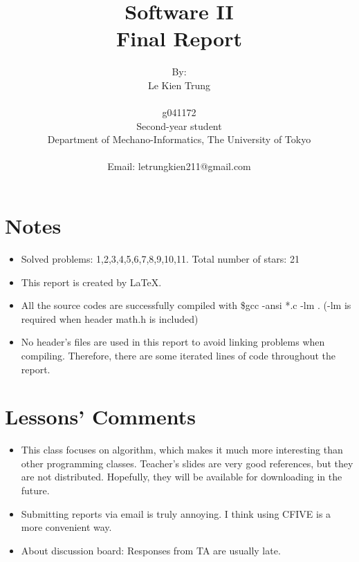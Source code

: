 \documentclass[11pt]{article}
\begin{document}
\begin{titlepage}
\title{\bf \Huge Software II\\
\huge Final Report}
\author{By:\\ Le Kien Trung\\\\
g041172\\
Second-year student\\
Department of Mechano-Informatics, The University of Tokyo \\\\
Email: letrungkien211@gmail.com
}
\maketitle
\thispagestyle{empty}
\end{titlepage}
\setcounter{page}{1}
\tableofcontents
\newpage
\section*{Notes}
\begin{itemize}
\item
Solved problems: 1,2,3,4,5,6,7,8,9,10,11. Total number of stars: 21
\item This report is created by \LaTeX.
\item All the source codes are successfully compiled with \$gcc -ansi *.c -lm . (-lm is required when header math.h is included)
\item No header's files are used in this report to avoid linking problems when compiling. Therefore, there are some iterated lines of code throughout the report. 
\end{itemize}
\section*{Lessons' Comments}
\begin{itemize}
\item This class focuses on algorithm, which makes it much more interesting than other programming classes. Teacher's slides are very good references, but they are not distributed. Hopefully, they will be available for downloading in the future.
\item Submitting reports via email is truly annoying. I think using CFIVE is a more convenient way.
\item About discussion board: Responses from TA are usually late.
\end{itemize}
\end{document}
